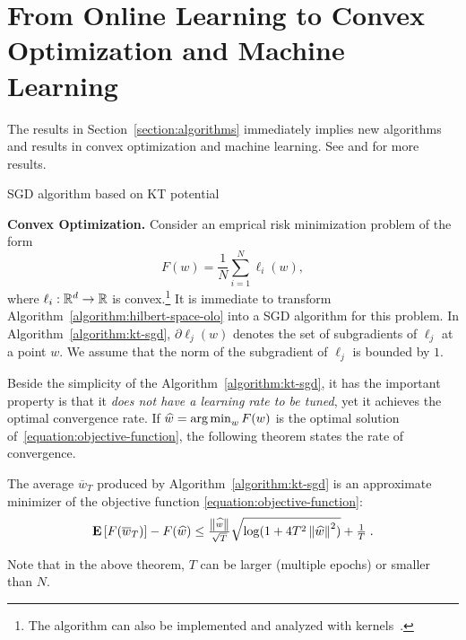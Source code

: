 \section{From Online Learning to Convex Optimization and Machine Learning}
\label{section:applications}

The results in Section~\ref{section:algorithms} immediately implies new
algorithms and results in convex optimization and machine learning. See
\cite{Orabona-2014} and \cite{Luo-Schapire-2015} for more results.

\begin{algorithm}[t]
\caption{SGD algorithm based on KT potential \label{algorithm:kt-sgd}}
\begin{algorithmic}[1]
{
\ENDFOR
{}
}
\end{algorithmic}
\end{algorithm}

\textbf{Convex Optimization.} 
Consider an emprical risk minimization problem of the form
%
\begin{equation}
\label{equation:objective-function}
F(w) = \frac{1}{N} \sum_{i=1}^N \ell_i(w),
\end{equation}
%
where $\ell_i:\mathbb{R}^d \to \mathbb{R}$ is convex.\footnote{The algorithm can also be
implemented and analyzed with kernels~\citep{Orabona-2014}.} It is immediate to
transform Algorithm~\ref{algorithm:hilbert-space-olo} into a \ac{SGD} algorithm
for this problem. In Algorithm~\ref{algorithm:kt-sgd}, $\partial\ell_j(w)$
denotes the set of subgradients of $\ell_j$ at a point $w$.  We assume that the
norm of the subgradient of $\ell_j$ is bounded by $1$.

Beside the simplicity of the Algorithm~\ref{algorithm:kt-sgd}, it has the
important property is that it \emph{does not have a learning rate to be tuned},
yet it achieves the optimal convergence rate. If $\widehat{w} = \operatorname*{arg\,min}_w F(w)$
is the optimal solution of~\eqref{equation:objective-function}, the following
theorem states the rate of convergence.
%
\begin{theorem}
The average $\overline{w}_T$ produced by Algorithm~\ref{algorithm:kt-sgd} is
an approximate minimizer of the objective function \eqref{equation:objective-function}:
\[
\operatorname*{\mathbf{E}}\left[F(\overline{w}_T)\right] - F(\widehat{w}) \leq \tfrac{\left\|{\widehat{w}}\right\|}{\sqrt{T}} \sqrt{\log(1+4 T^2 \left\|{\widehat{w}}\right\|^2)} +\tfrac{1}{T} \; .
\]
\end{theorem}
%
Note that in the above theorem, $T$ can be larger (multiple epochs) or smaller
than $N$.


